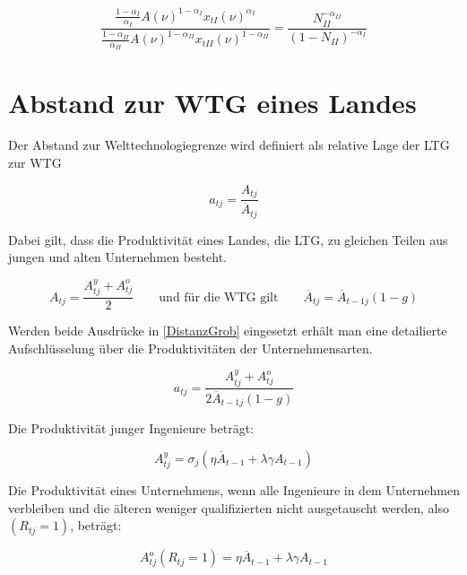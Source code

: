\begin{equation}
\boxed{\frac{\frac{1-\alpha_I}{\alpha_I}A(\nu)^{1-\alpha_I}x_{tI}(\nu)^{\alpha_I}}{\frac{1-\alpha_{II}}{\alpha_{II}}A(\nu)^{1-\alpha_{II}}x_{tII}(\nu)^{1-\alpha_{II}}}=\frac{N_{II}^{-\alpha_{II}}}{(1-N_{II})^{-\alpha_I}}}
\end{equation}


\section{Abstand zur WTG eines Landes}\label{sec:Abstand WTG}


Der Abstand zur Welttechnologiegrenze wird definiert als relative Lage der LTG zur WTG


\begin{equation}
a_{tj}=\frac{A_{tj}}{\overline{A}_{tj}}\label{DistanzGrob}
\end{equation}


Dabei gilt, dass die Produktivität eines Landes, die LTG, zu gleichen Teilen aus jungen und alten Unternehmen besteht. 


\begin{equation*}
A_{tj}=\frac{A_{tj}^y+A_{tj}^o}{2} \qquad \text{und für die WTG gilt}\qquad \overline{A}_{tj}= \overline{A}_{t-1j}(1-g)
\end{equation*}


Werden beide Ausdrücke in \eqref{DistanzGrob} eingesetzt erhält man eine detailierte Aufschlüsselung über die Produktivitäten der Unternehmensarten.  


\begin{equation}
a_{tj}=\frac{A_{tj}^y+A_{tj}^o}{2\overline{A}_{t-1j}(1-g)}\label{WTGgrob}
\end{equation}


Die Produktivität junger Ingenieure beträgt:

 
\begin{equation}
A_{tj}^{y}=\sigma_j(\eta\overline{A}_{t-1}+\lambda\gamma A_{t-1})\label{jung}
\end{equation}


Die Produktivität eines Unternehmens, wenn alle Ingenieure in dem Unternehmen verbleiben und die älteren weniger qualifizierten nicht ausgetauscht werden, also $(R_{tj}=1)$, beträgt: 


\begin{equation}
A_{tj}^{o}(R_{tj}=1)=\eta\overline{A}_{t-1}+\lambda\gamma A_{t-1}\label{behalten}
\end{equation}


